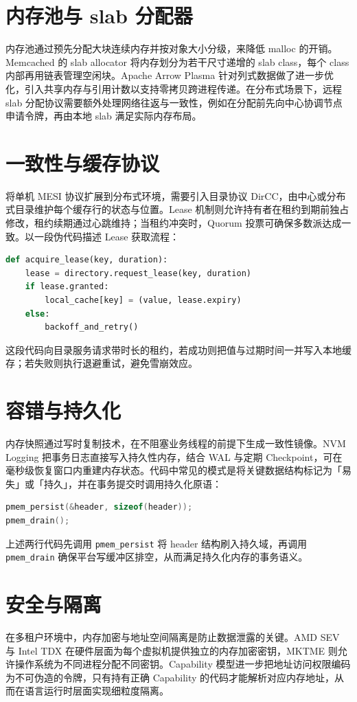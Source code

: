 \chapter{内存池与 slab 分配器}
内存池通过预先分配大块连续内存并按对象大小分级，来降低 malloc 的开销。Memcached 的 slab allocator 将内存划分为若干尺寸递增的 slab class，每个 class 内部再用链表管理空闲块。Apache Arrow Plasma 针对列式数据做了进一步优化，引入共享内存与引用计数以支持零拷贝跨进程传递。在分布式场景下，远程 slab 分配协议需要额外处理网络往返与一致性，例如在分配前先向中心协调节点申请令牌，再由本地 slab 满足实际内存布局。\par
\chapter{一致性与缓存协议}
将单机 MESI 协议扩展到分布式环境，需要引入目录协议 DirCC，由中心或分布式目录维护每个缓存行的状态与位置。Lease 机制则允许持有者在租约到期前独占修改，租约续期通过心跳维持；当租约冲突时，Quorum 投票可确保多数派达成一致。以一段伪代码描述 Lease 获取流程：\par
\begin{lstlisting}[language=python]
def acquire_lease(key, duration):
    lease = directory.request_lease(key, duration)
    if lease.granted:
        local_cache[key] = (value, lease.expiry)
    else:
        backoff_and_retry()
\end{lstlisting}
这段代码向目录服务请求带时长的租约，若成功则把值与过期时间一并写入本地缓存；若失败则执行退避重试，避免雪崩效应。\par
\chapter{容错与持久化}
内存快照通过写时复制技术，在不阻塞业务线程的前提下生成一致性镜像。NVM Logging 把事务日志直接写入持久性内存，结合 WAL 与定期 Checkpoint，可在毫秒级恢复窗口内重建内存状态。代码中常见的模式是将关键数据结构标记为「易失」或「持久」，并在事务提交时调用持久化原语：\par
\begin{lstlisting}[language=c]
pmem_persist(&header, sizeof(header));
pmem_drain();
\end{lstlisting}
上述两行代码先调用 \texttt{pmem\_{}persist} 将 header 结构刷入持久域，再调用 \texttt{pmem\_{}drain} 确保平台写缓冲区排空，从而满足持久化内存的事务语义。\par
\chapter{安全与隔离}
在多租户环境中，内存加密与地址空间隔离是防止数据泄露的关键。AMD SEV 与 Intel TDX 在硬件层面为每个虚拟机提供独立的内存加密密钥，MKTME 则允许操作系统为不同进程分配不同密钥。Capability 模型进一步把地址访问权限编码为不可伪造的令牌，只有持有正确 Capability 的代码才能解析对应内存地址，从而在语言运行时层面实现细粒度隔离。\par
